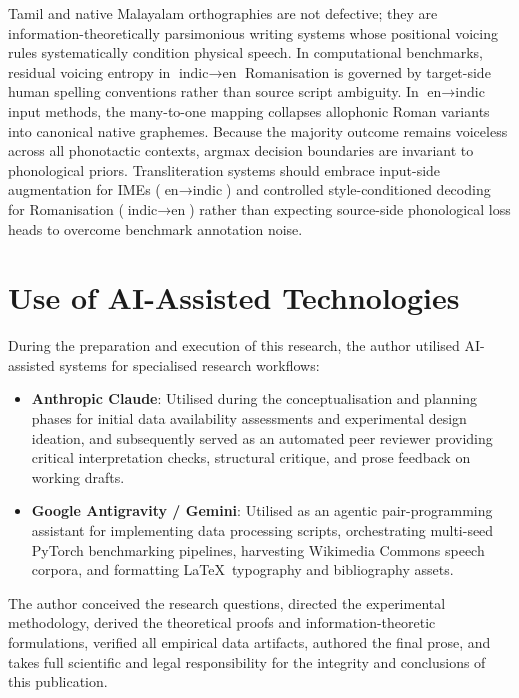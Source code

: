 \documentclass[11pt]{article}
\begin{document}
Tamil and native Malayalam orthographies are not defective; they are information-theoretically
parsimonious writing systems whose positional voicing rules systematically condition physical speech. In
computational benchmarks, residual voicing entropy in $\text{indic}\rightarrow\text{en}$ Romanisation is governed by target-side human spelling
conventions rather than source script ambiguity. In $\text{en}\rightarrow\text{indic}$ input methods, the many-to-one mapping collapses allophonic Roman variants into canonical native graphemes. Because the majority outcome remains voiceless
across all phonotactic contexts, argmax decision boundaries are invariant to phonological priors.
Transliteration systems should embrace input-side augmentation for IMEs ($\text{en}\rightarrow\text{indic}$) and controlled style-conditioned decoding for Romanisation ($\text{indic}\rightarrow\text{en}$)
rather than expecting source-side phonological loss heads to overcome benchmark annotation noise.

\section*{Use of AI-Assisted Technologies}
During the preparation and execution of this research, the author utilised AI-assisted systems for specialised research workflows:
\begin{itemize}
    \item \textbf{Anthropic Claude}: Utilised during the conceptualisation and planning phases for initial data availability assessments and experimental design ideation, and subsequently served as an automated peer reviewer providing critical interpretation checks, structural critique, and prose feedback on working drafts.
    \item \textbf{Google Antigravity / Gemini}: Utilised as an agentic pair-programming assistant for implementing data processing scripts, orchestrating multi-seed PyTorch benchmarking pipelines, harvesting Wikimedia Commons speech corpora, and formatting \LaTeX\ typography and bibliography assets.
\end{itemize}
The author conceived the research questions, directed the experimental methodology, derived the theoretical proofs and information-theoretic formulations, verified all empirical data artifacts, authored the final prose, and takes full scientific and legal responsibility for the integrity and conclusions of this publication.



\end{document}
